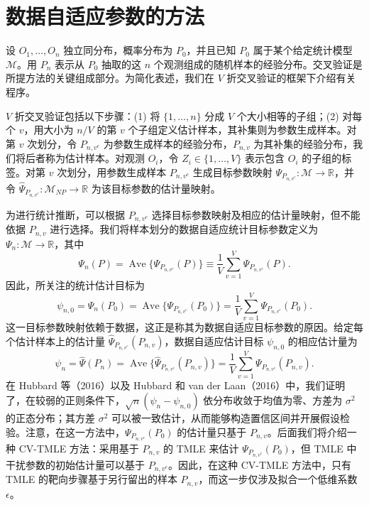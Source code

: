 \section{数据自适应参数的方法}

设 $O_1,\ldots,O_n$ 独立同分布，概率分布为 $P_0$，并且已知 $P_0$ 属于某个给定统计模型 $\mathcal M$。用 $P_n$ 表示从 $P_0$ 抽取的这 $n$ 个观测组成的随机样本的经验分布。交叉验证是所提方法的关键组成部分。为简化表述，我们在 $V$ 折交叉验证的框架下介绍有关程序。

$V$ 折交叉验证包括以下步骤：(1) 将 $\{1,\ldots,n\}$ 分成 $V$ 个大小相等的子组；(2) 对每个 $v$，用大小为 $n/V$ 的第 $v$ 个子组定义估计样本，其补集则为参数生成样本。对第 $v$ 次划分，令 $P_{n,v^c}$ 为参数生成样本的经验分布，$P_{n,v}$ 为其补集的经验分布，我们将后者称为估计样本。对观测 $O_i$，令 $Z_i\in\{1,\ldots,V\}$ 表示包含 $O_i$ 的子组的标签。对第 $v$ 次划分，用参数生成样本 $P_{n,v^c}$ 生成目标参数映射 $\Psi_{P_{n,v^c}}:\mathcal M\to\mathbb R$，并令 $\hat\Psi_{P_{n,v^c}}:\mathcal M_{NP}\to\mathbb R$ 为该目标参数的估计量映射。

为进行统计推断，可以根据 $P_{n,v^c}$ 选择目标参数映射及相应的估计量映射，但不能依据 $P_{n,v}$ 进行选择。我们将样本划分的数据自适应统计目标参数定义为 $\Psi_n:\mathcal M\to\mathbb R$，其中
\[
\Psi_n(P)=\operatorname{Ave}\{\Psi_{P_{n,v^c}}(P)\}
\equiv\frac1V\sum_{v=1}^V\Psi_{P_{n,v^c}}(P).
\]
因此，所关注的统计估计目标为
\begin{equation}
\psi_{n,0}=\Psi_n(P_0)=\operatorname{Ave}\{\Psi_{P_{n,v^c}}(P_0)\}
=\frac1V\sum_{v=1}^V\Psi_{P_{n,v^c}}(P_0).
\tag{9.6}
\end{equation}
这一目标参数映射依赖于数据，这正是称其为数据自适应目标参数的原因。给定每个估计样本上的估计量 $\hat\Psi_{P_{n,v^c}}(P_{n,v})$，数据自适应估计目标 $\psi_{n,0}$ 的相应估计量为
\begin{equation}
\psi_n=\hat\Psi(P_n)=\operatorname{Ave}\{\hat\Psi_{P_{n,v^c}}(P_{n,v})\}
=\frac1V\sum_{v=1}^V\Psi_{P_{n,v^c}}(P_{n,v}).
\tag{9.7}
\end{equation}
在 Hubbard 等（2016）以及 Hubbard 和 van der Laan（2016）中，我们证明了，在较弱的正则条件下，$\sqrt n(\psi_n-\psi_{n,0})$ 依分布收敛于均值为零、方差为 $\sigma^2$ 的正态分布；其方差 $\sigma^2$ 可以被一致估计，从而能够构造置信区间并开展假设检验。注意，在这一方法中，$\Psi_{P_{n,v^c}}(P_0)$ 的估计量只基于 $P_{n,v}$。后面我们将介绍一种 CV-TMLE 方法：采用基于 $P_{n,v}$ 的 TMLE 来估计 $\Psi_{P_{n,v^c}}(P_0)$，但 TMLE 中干扰参数的初始估计量可以基于 $P_{n,v^c}$。因此，在这种 CV-TMLE 方法中，只有 TMLE 的靶向步骤基于另行留出的样本 $P_{n,v}$，而这一步仅涉及拟合一个低维系数 $\epsilon$。
